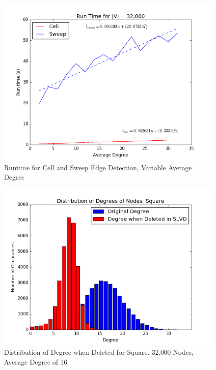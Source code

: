 \documentclass{article}
\begin{document}
\begin{figure}
    \centering
    \includegraphics[scale=0.6]{./graphs/run_time_var_avg_deg.png}
    \caption{Runtime for Cell and Sweep Edge Detection, Variable Average Degree}
    \label{varavgdeg}
\end{figure}

\begin{figure}
    \centering
    \includegraphics[scale=0.6]{./graphs/hist_del_deg.png}
    \caption{Distribution of Degree when Deleted for Square. 32,000 Nodes, Average Degree of 16}
    \label{deldeg}
\end{figure}
\end{document}
